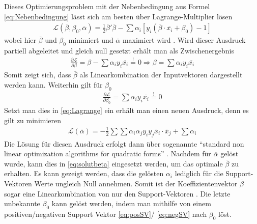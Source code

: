 \documentclass[
]{article}
\begin{document}
Dieses Optimierungsproblem mit der Nebenbedingung aus Formel
\eqref{eq:Nebenbedingung} lässt sich am besten über Lagrange-Multiplier
lösen \begin{align}
\mathcal{L}(\overline\beta,\beta_0,\overline \alpha)=\frac{1}{2}\overline \beta ' \overline \beta-\sum \alpha_i[y_i(\overline \beta \cdot \overline{x_i}+\beta_0)-1]\label{eq:Lagrange}
\end{align} wobei hier \(\overline{\beta}\) und \(\beta_0\) minimiert
und \(\overline{\alpha}\) maximiert wird
\parencite{vapnikEstimationDependencesBased2006}. Wird dieser Ausdruck
partiell abgeleitet und gleich null gesetzt erhält man als
Zwischenergebnis \begin{align}
\frac{\partial \mathcal{L}}{\partial \beta}=\beta-\sum \alpha_i y_i \overline{x_i}\overset{!}{=}0 \Rightarrow \beta=\sum \alpha_i y_i \overline{x_i}\label{eq:solutbeta}
\end{align} Somit zeigt sich, dass \(\overline{\beta}\) als
Linearkombination der Inputvektoren dargestellt werden kann. Weiterhin
gilt für \(\beta_0\) \begin{align}
\frac{\partial \mathcal{L}}{\partial \beta_0}=\sum \alpha_i y_i \overline{x_i}\overset{!}{=}0\label{eq:solutbeta0}
\end{align} Setzt man dies in \eqref{eq:Lagrange} ein erhält man einen
neuen Ausdruck, denn es gilt zu minimieren \begin{align}
\mathcal{L}(\overline \alpha)=-\frac{1}{2}\sum \sum \alpha_i \alpha_j y_i y_j \overline{x}_i \cdot \overline{x}_j+\sum \alpha_i\label{eq:dualproblem}
\end{align} Die Lösung für diesen Ausdruck erfolgt dann über sogenannte
\enquote{standard non linear optimization algorithms for quadratic forms}
\parencite{boserTrainingAlgorithmOptimal1992}. Nachdem für
\(\overline \alpha\) gelöst wurde, kann dies in \eqref{eq:solutbeta}
eingesetzt werden, um das optimale \(\overline{\beta}\) zu erhalten. Es
kann gezeigt werden, dass die gelösten \(\alpha_i\) lediglich für die
Support-Vektoren Werte ungleich Null annehmen. Somit ist der
Koeffizientenvektor \(\overline{\beta}\) sogar eine Linearkombination
von nur den Support-Vektoren
\parencite{boserTrainingAlgorithmOptimal1992}. Die letzte unbekannte
\(\beta_0\) kann gelöst werden, indem man mithilfe von einem
positiven/negativen Support Vektor \eqref{eq:posSV}/ \eqref{eq:negSV}
nach \(\beta_0\) löst.
\end{document}
